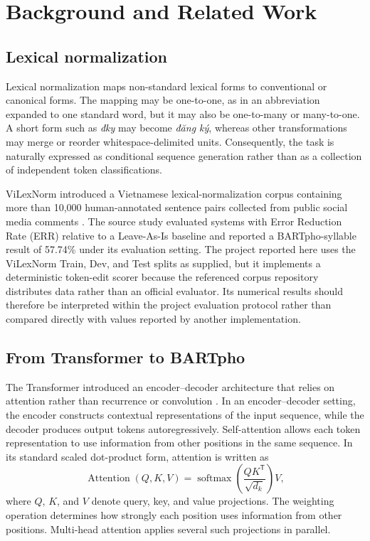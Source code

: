 \documentclass[11pt]{article}
\begin{document}
\section{Background and Related Work}

\subsection{Lexical normalization}

Lexical normalization maps non-standard lexical forms to conventional or canonical forms. The mapping may be one-to-one, as in an abbreviation expanded to one standard word, but it may also be one-to-many or many-to-one. A short form such as \textit{đky} may become \textit{đăng ký}, whereas other transformations may merge or reorder whitespace-delimited units. Consequently, the task is naturally expressed as conditional sequence generation rather than as a collection of independent token classifications.

ViLexNorm introduced a Vietnamese lexical-normalization corpus containing more than 10,000 human-annotated sentence pairs collected from public social media comments \citep{nguyen2024vilexnorm}. The source study evaluated systems with Error Reduction Rate (ERR) relative to a Leave-As-Is baseline and reported a BARTpho-syllable result of 57.74\% under its evaluation setting. The project reported here uses the ViLexNorm Train, Dev, and Test splits as supplied, but it implements a deterministic token-edit scorer because the referenced corpus repository distributes data rather than an official evaluator. Its numerical results should therefore be interpreted within the project evaluation protocol rather than compared directly with values reported by another implementation.

\subsection{From Transformer to BARTpho}

The Transformer introduced an encoder--decoder architecture that relies on attention rather than recurrence or convolution \citep{vaswani2017attention}. In an encoder--decoder setting, the encoder constructs contextual representations of the input sequence, while the decoder produces output tokens autoregressively. Self-attention allows each token representation to use information from other positions in the same sequence. In its standard scaled dot-product form, attention is written as
\begin{equation}
\operatorname{Attention}(Q,K,V)=
\operatorname{softmax}\left(\frac{QK^{\mathsf{T}}}{\sqrt{d_k}}\right)V,
\end{equation}
where $Q$, $K$, and $V$ denote query, key, and value projections. The weighting operation determines how strongly each position uses information from other positions. Multi-head attention applies several such projections in parallel.
\end{document}
